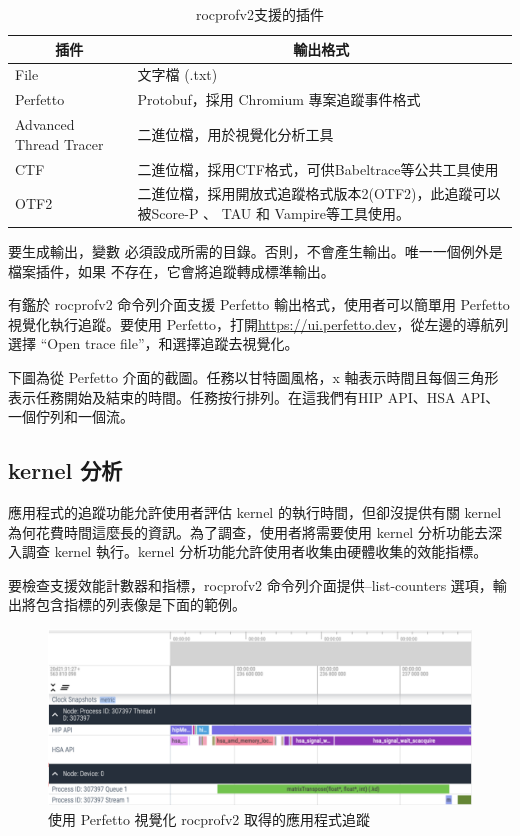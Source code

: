 \begin{table}[htbp]
    \centering
    \begin{tabular}{p{4cm}p{10cm}}
        \toprule
        \multicolumn{1}{c}{插件} &
        \multicolumn{1}{c}{輸出格式} \\
        \midrule
        File & 文字檔 (.txt) \\
        Perfetto & Protobuf，採用 Chromium 專案追蹤事件格式 \\
        Advanced Thread Tracer &  二進位檔，用於視覺化分析工具 \\
        CTF & 二進位檔，採用CTF格式，可供Babeltrace等公共工具使用 \\
        OTF2 & 二進位檔，採用開放式追蹤格式版本2(OTF2)，此追蹤可以被Score-P 、 TAU 和 Vampire等工具使用。 \\
        \bottomrule
    \end{tabular}
    \caption{rocprofv2支援的插件}
    \label{tab:plugins}
\end{table}

要生成輸出，變數  必須設成所需的目錄。否則，不會產生輸出。唯一一個例外是檔案插件，如果  不存在，它會將追蹤轉成標準輸出。

有鑑於 rocprofv2 命令列介面支援 Perfetto 輸出格式，使用者可以簡單用 Perfetto 視覺化執行追蹤。要使用 Perfetto，打開\url{https://ui.perfetto.dev}，從左邊的導航列選擇 “Open trace file”，和選擇追蹤去視覺化。

下圖為從 Perfetto 介面的截圖。任務以甘特圖風格，x 軸表示時間且每個三角形表示任務開始及結束的時間。任務按行排列。在這我們有HIP API、HSA API、一個佇列和一個流。

\subsection{kernel 分析}

應用程式的追蹤功能允許使用者評估 kernel 的執行時間，但卻沒提供有關 kernel 為何花費時間這麼長的資訊。為了調查，使用者將需要使用 kernel 分析功能去深入調查 kernel 執行。kernel 分析功能允許使用者收集由硬體收集的效能指標。

要檢查支援效能計數器和指標，rocprofv2 命令列介面提供–list-counters 選項，輸出將包含指標的列表像是下面的範例。

\begin{figure}
    \centering
    \includegraphics[width=1\linewidth]{FileAusiliari/Screenshots/Figure7-5.png}
    \caption{使用 Perfetto 視覺化 rocprofv2 取得的應用程式追蹤}
    \label{fig:captured application trace}
\end{figure}


